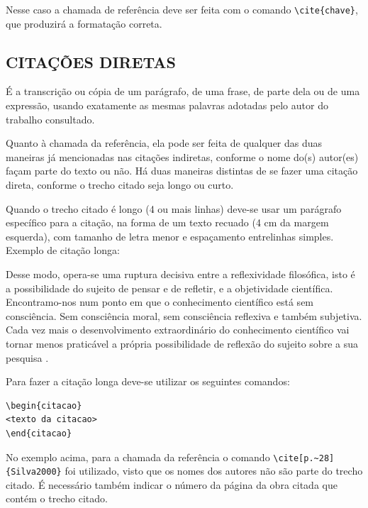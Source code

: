 Nesse caso a chamada de referência deve ser feita com o comando \verb|\cite{chave}|, que produzirá a formatação correta.

\subsection{CITAÇÕES DIRETAS}
\label{subsec:citacoesLiterais}

É a transcrição ou cópia de um parágrafo, de uma frase, de parte dela ou de uma expressão, usando exatamente as mesmas palavras adotadas pelo autor do trabalho consultado.

Quanto à chamada da referência, ela pode ser feita de qualquer das duas maneiras já mencionadas nas citações indiretas, conforme o nome do(s) autor(es) façam parte do texto ou não. Há duas maneiras distintas de se fazer uma citação direta, conforme o trecho citado seja longo ou curto.

Quando o trecho citado é longo (4 ou mais linhas) deve-se usar um parágrafo específico para a citação, na forma de um texto recuado (4 cm da margem esquerda), com tamanho de letra menor e espaçamento entrelinhas simples. Exemplo de citação longa:
\\\begin{citacao}
    Desse modo, opera-se uma ruptura decisiva entre a reflexividade filosófica, isto é a possibilidade do sujeito de pensar e de refletir, e a objetividade científica. Encontramo-nos num ponto em que o conhecimento científico está sem consciência. Sem consciência moral, sem consciência reflexiva e também subjetiva. Cada vez mais o desenvolvimento extraordinário do conhecimento científico vai tornar menos praticável a própria possibilidade de reflexão do sujeito sobre a sua pesquisa \cite[p.~28]{Silva2000}.
\end{citacao}

Para fazer a citação longa deve-se utilizar os seguintes comandos:
\begin{verbatim}
\begin{citacao}
<texto da citacao>
\end{citacao}
\end{verbatim}

No exemplo acima, para a chamada da referência o comando \verb|\cite[p.~28]{Silva2000}| foi utilizado, visto que os nomes dos autores não são parte do trecho citado. É necessário também indicar o número da página da obra citada que contém o trecho citado.

